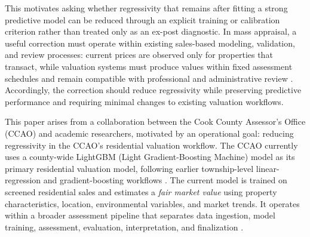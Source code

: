 \documentclass[10pt]{article}
\theoremstyle{definition}
\newcommand{\1}{\mathbf{1}}
\begin{document}
{This motivates asking whether regressivity that remains after fitting a strong predictive model can be reduced through an explicit training or calibration criterion rather than treated only as an ex-post diagnostic. In mass appraisal, a useful correction must operate within existing sales-based modeling, validation, and review processes: current prices are observed only for properties that transact, while valuation systems must produce values within fixed assessment schedules and remain compatible with professional and administrative review \cite{IAAO2020SalesVerification,IAAO2018AVM,IAAO2025Mass}. Accordingly, the correction should reduce regressivity while preserving predictive performance and requiring minimal changes to existing valuation workflows.}

This paper arises from a collaboration between the Cook County Assessor's Office (CCAO) and academic researchers, motivated by an operational goal: reducing regressivity in the CCAO's residential valuation workflow. The CCAO currently uses a county-wide LightGBM (Light Gradient-Boosting Machine) model \cite{lightgbm} as its primary residential valuation model, {following earlier township-level linear-regression and gradient-boosting workflows} \cite{CCAOModelResAVM2026}. The current model is trained on screened residential sales and estimates a \emph{fair market value} using property characteristics, location, environmental variables, and market trends. It operates within a broader assessment pipeline that separates data ingestion, model training, assessment, evaluation, interpretation, and finalization \cite{CCAOModelResAVM2026}.

\end{document}
